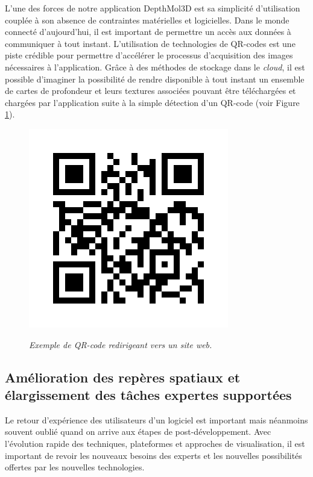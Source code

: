 L'une des forces de notre application DepthMol3D est sa simplicité d'utilisation couplée à son absence de contraintes matérielles et logicielles. Dans le monde connecté d'aujourd'hui, il est important de permettre un accès aux données à communiquer à tout instant. L'utilisation de technologies de QR-codes est une piste crédible pour permettre d'accélérer le processus d'acquisition des images nécessaires à l'application. Grâce à des méthodes de stockage dans le \textit{cloud}, il est possible d'imaginer la possibilité de rendre disponible à tout instant un ensemble de cartes de profondeur et leurs textures associées pouvant être téléchargées et chargées par l'application suite à la simple détection d'un QR-code (voir Figure \ref{Fig:qr_code}).

\begin{figure}[h]
  \centering
  {\includegraphics[width=.75\linewidth]{./figures/conclusion/qr_code.jpg}}
    \caption{{\it Exemple de QR-code redirigeant vers un site web.}}
  \label{Fig:qr_code}
  \hspace{0.2cm}
\end{figure}

\subsection*{Amélioration des repères spatiaux et élargissement des tâches expertes supportées}

Le retour d'expérience des utilisateurs d'un logiciel est important mais néanmoins souvent oublié quand on arrive aux étapes de post-développement. Avec l'évolution rapide des techniques, plateformes et approches de visualisation, il est important de revoir les nouveaux besoins des experts et les nouvelles possibilités offertes par les nouvelles technologies. 

